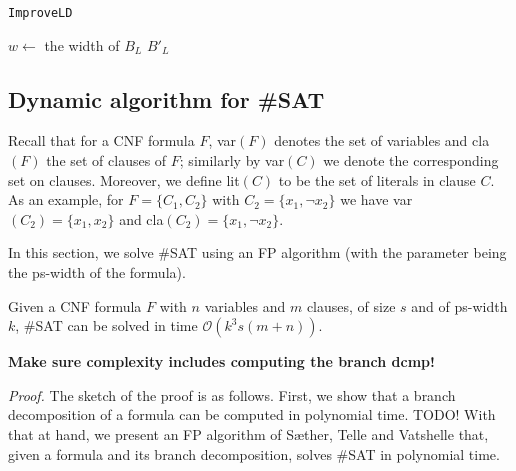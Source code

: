 \begin{algorithm}
	\LinesNumbered
	\caption{\texttt{ImproveLD} \cite{DBLP:journals/tocl/LodhaOS19}}
	\label{alg:ps-bd-improveld}
	

	$w \gets $ the width of $B_L$\;
	\Return $B'_L$\;
\end{algorithm}











\subsection{Dynamic algorithm for \#SAT}

Recall that for a CNF formula $F$, var$(F)$ denotes the set of variables and cla$(F)$ the set of clauses of $F$;
similarly by var$(C)$ we denote the corresponding set on clauses.
Moreover, we define lit$(C)$ to be the set of literals in clause $C$.
As an example, for $F = \{ C_1, C_2 \}$ with $C_2 = \{ x_1, \neg x_2 \}$ we have var$(C_2) = \{ x_1, x_2 \}$ and cla$(C_2) = \{ x_1, \neg x_2 \}$.

In this section, we solve \#SAT using an FP algorithm (with the parameter being the ps-width of the formula).

\begin{theorem}
	Given a CNF formula $F$ with $n$ variables and $m$ clauses, of size $s$ and of ps-width $k$, \#SAT can be solved in time $\mathcal{O}(k^3s(m+n))$.
	
	\textbf{Make sure complexity includes computing the branch dcmp!}
\end{theorem}

\noindent
{\em Proof.}
The sketch of the proof is as follows.
First, we show that a branch decomposition of a formula can be computed in polynomial time. TODO!
With that at hand, we present an FP algorithm of S\ae ther, Telle and Vatshelle \cite{DBLP:conf/sat/SaetherTV14} that, given a formula and its branch decomposition, solves \#SAT in polynomial time.

